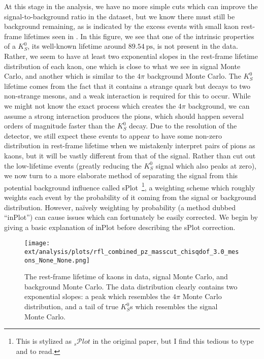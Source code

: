 At this stage in the analysis, we have no more simple cuts which can improve the signal-to-background ratio in the dataset, but we know there must still be background remaining, as is indicated by the excess events with small kaon rest-frame lifetimes seen in . In this figure, we see that one of the intrinsic properties of a $K_S^0$, its well-known lifetime around $\SI{89.54}{\pico\second}$, is not present in the data. Rather, we seem to have at least two exponential slopes in the rest-frame lifetime distribution of each kaon, one which is close to what we see in signal Monte Carlo, and another which is similar to the $4\pi$ background Monte Carlo. The $K_S^0$ lifetime comes from the fact that it contains a strange quark but decays to two non-strange mesons, and a weak interaction is required for this to occur. While we might not know the exact process which creates the $4\pi$ background, we can assume a strong interaction produces the pions, which should happen several orders of magnitude faster than the $K_S^0$ decay. Due to the resolution of the detector, we still expect these events to appear to have some non-zero distribution in rest-frame lifetime when we mistakenly interpret pairs of pions as kaons, but it will be vastly different from that of the signal. Rather than cut out the low-lifetime events (greatly reducing the $K_S^0$ signal which also peaks at zero), we now turn to a more elaborate method of separating the signal from this potential background influence called sPlot~\cite{Pivk2005}\footnote{This is stylized as ${}_s\mathcal{P}lot$ in the original paper, but I find this tedious to type and to read.}, a weighting scheme which roughly weights each event by the probability of it coming from the signal or background distribution. However, na\"ively weighting by probability (a method dubbed ``inPlot'') can cause issues which can fortunately be easily corrected. We begin by giving a basic explanation of inPlot before describing the sPlot correction.

\begin{figure}
  \begin{center}
      \texttt{[image: ext/analysis/plots/rfl\_combined\_pz\_masscut\_chisqdof\_3.0\_mesons\_None\_None.png]}
  \end{center}
  \caption{The rest-frame lifetime of kaons in data, signal Monte Carlo, and background Monte Carlo. The data distribution clearly contains two exponential slopes: a peak which resembles the $4\pi$ Monte Carlo distribution, and a tail of true $K_S^0$s which resembles the signal Monte Carlo.}\label{fig:rfl-pre-splot}
\end{figure}

